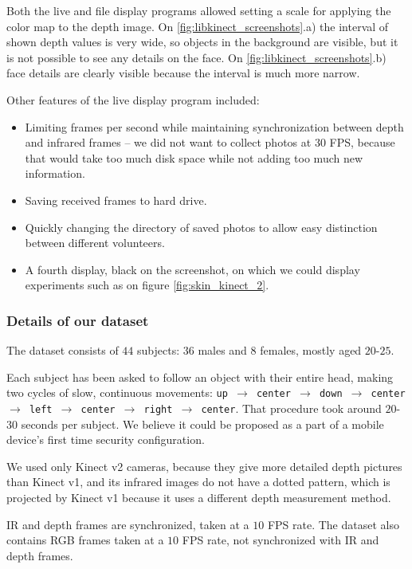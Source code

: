     Both the live and file display programs allowed setting a scale for applying the color
    map to the depth image. On \ref{fig:libkinect_screenshots}.a) the interval of shown
    depth values is very wide, so objects in the background are visible, but it is not
    possible to see any details on the face. On \ref{fig:libkinect_screenshots}.b)
    face details are clearly visible because the interval is much more narrow.

    Other features of the live display program included:
    \begin{itemize}
        \item Limiting frames per second while maintaining synchronization
        between depth and infrared frames -- we did not want to collect photos at 30 FPS,
        because that would take too much disk space while not adding too much new
        information.
        \item Saving received frames to hard drive.
        \item Quickly changing the directory of saved photos to allow easy distinction
        between different volunteers.
        \item A fourth display, black on the screenshot, on which we could display
        experiments such as on figure \ref{fig:skin_kinect_2}.
    \end{itemize}


    \subsubsection*{Details of our dataset}
    The dataset consists of $44$ subjects: $36$ males and
    $8$ females, mostly aged $20$-$25$.

    Each subject has been asked to
    follow an object with their entire head, making two cycles of slow,
    continuous movements: \texttt{up $\to$ center $\to$ down $\to$ center $\to$
    left $\to$ center $\to$ right $\to$ center}.
    That procedure took around $20$-$30$ seconds per subject.
    We believe it could be proposed as a part of a mobile device's first time security configuration.

    We used only Kinect v2 cameras, because they give more detailed depth pictures
    than Kinect v1, and its infrared images do not have a dotted pattern,
    which is projected by Kinect v1 because it uses a different depth
    measurement method.

    IR and depth frames are synchronized, taken at a $10$ FPS rate.
    The dataset also contains RGB frames taken at a $10$ FPS rate, not synchronized
    with IR and depth frames.

